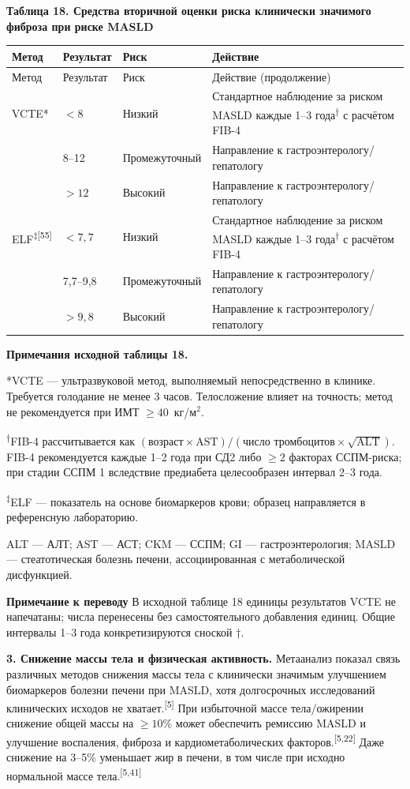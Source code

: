 \documentclass[11pt,a4paper]{article}
\newcommand{\src}[1]{\textsuperscript{[#1]}}
\newcommand{\editorial}[1]{\par\begingroup\small\color{black!70}\textbf{Примечание к переводу} #1\par\endgroup}
\newcommand{\heading}[1]{\par\medskip\textbf{#1}\par}
\begin{document}
\heading{Таблица 18. Средства вторичной оценки риска клинически значимого фиброза при риске MASLD}
{\small
\begin{longtable}{P{0.25\textwidth}P{0.11\textwidth}P{0.18\textwidth}P{0.36\textwidth}}
\toprule Метод & Результат & Риск & Действие\\\midrule
\endfirsthead
\toprule Метод & Результат & Риск & Действие (продолжение)\\\midrule
\endhead
VCTE* & $<8$ & Низкий & Стандартное наблюдение за риском MASLD каждые 1--3 года\textsuperscript{†} с расчётом FIB-4\\[4pt]
 & 8--12 & Промежуточный & Направление к гастроэнтерологу/гепатологу\\[4pt]
 & $>12$ & Высокий & Направление к гастроэнтерологу/гепатологу\\[4pt]
ELF\textsuperscript{‡}\src{55} & $<7{,}7$ & Низкий & Стандартное наблюдение за риском MASLD каждые 1--3 года\textsuperscript{†} с расчётом FIB-4\\[4pt]
 & 7,7--9,8 & Промежуточный & Направление к гастроэнтерологу/гепатологу\\[4pt]
 & $>9{,}8$ & Высокий & Направление к гастроэнтерологу/гепатологу\\
\bottomrule
\end{longtable}
}
\textbf{Примечания исходной таблицы 18.}

*VCTE --- ультразвуковой метод, выполняемый непосредственно в клинике. Требуется голодание не менее 3 часов. Телосложение влияет на точность; метод не рекомендуется при ИМТ $\geq40$~кг/м$^2$.

\textsuperscript{†}FIB-4 рассчитывается как $(\text{возраст}\times\mathrm{AST})/(\text{число тромбоцитов}\times\sqrt{\mathrm{ALT}})$. FIB-4 рекомендуется каждые 1--2 года при СД2 либо $\geq2$ факторах ССПМ-риска; при стадии ССПМ 1 вследствие предиабета целесообразен интервал 2--3 года.

\textsuperscript{‡}ELF --- показатель на основе биомаркеров крови; образец направляется в референсную лабораторию.

ALT --- АЛТ; AST --- АСТ; CKM --- ССПМ; GI --- гастроэнтерология; MASLD --- стеатотическая болезнь печени, ассоциированная с метаболической дисфункцией.
\editorial{В исходной таблице 18 единицы результатов VCTE не напечатаны; числа перенесены без самостоятельного добавления единиц. Общие интервалы 1--3 года конкретизируются сноской †.}

\textbf{3. Снижение массы тела и физическая активность.} Метаанализ показал связь различных методов снижения массы тела с клинически значимым улучшением биомаркеров болезни печени при MASLD, хотя долгосрочных исследований клинических исходов не хватает.\src{5} При избыточной массе тела/ожирении снижение общей массы на $\geq10\%$ может обеспечить ремиссию MASLD и улучшение воспаления, фиброза и кардиометаболических факторов.\src{5,22} Даже снижение на 3--5\% уменьшает жир в печени, в том числе при исходно нормальной массе тела.\src{5,41}
\end{document}
